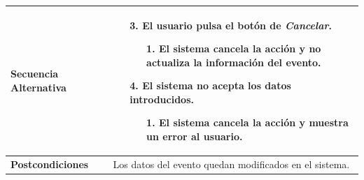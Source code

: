 \begin{longtable}{| p{4cm} | p{10cm} |}
\\
\hline
\textbf{Secuencia Alternativa} &\mbox{}\par\vspace{-\baselineskip}
\begin{enumerate}[leftmargin=0.9cm, topsep=0.1cm]
\item[3.] El usuario pulsa el botón de \textit{Cancelar}.
	\begin{itemize}
	\item[1.] El sistema cancela la acción y no actualiza la información del evento.
	\end{itemize}
\item[4.] El sistema no acepta los datos introducidos.
	\begin{itemize}
	\item[1.] El sistema cancela la acción y muestra un error al usuario.
	\end{itemize}
\end{enumerate}
\\

\hline
\textbf{Postcondiciones} & 
Los datos del evento quedan modificados en el sistema.\\
\hline
\end{longtable}



\newpage
